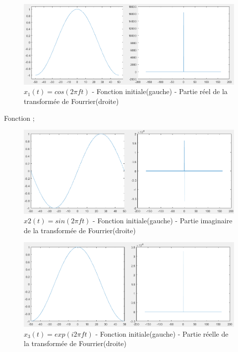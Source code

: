 \documentclass[10pt,a4paper]{article}
\begin{document}
\begin{figure}[h]
\begin{center}
\includegraphics[scale=0.7]{x1.png}
\caption{$x_1(t) = cos(2 \pi f t)$ - Fonction initiale(gauche) - Partie réel de la transformée de Fourrier(droite)}
\end{center}
\end{figure}

\newpage
Fonction ;\\	
\begin{figure}[!h]
\begin{center}
\includegraphics[scale=0.7]{x2_imag.png}
\caption{$x2(t) = sin(2\pi ft)$ - Fonction initiale(gauche) - Partie imaginaire de la transformée de Fourrier(droite)}
\end{center}
\end{figure}


\begin{figure}[h]
\begin{center}
\includegraphics[scale=0.7]{x3.png}
\caption{$x_3(t) = exp(i2\pi ft)$ - Fonction initiale(gauche) - Partie réelle de la transformée de Fourrier(droite)}
\end{center}
\end{figure}
\end{document}
